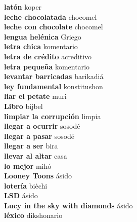 \textbf{ latón  } koper \\
\textbf{ leche chocolatada  } chocomel \\
\textbf{ leche con chocolate  } chocomel \\
\textbf{ lengua helénica  } Griego \\
\textbf{ letra chica  } komentario \\
\textbf{ letra de crédito  } acreditivo \\
\textbf{ letra pequeña  } komentario \\
\textbf{ levantar barricadas  } barikadiá \\
\textbf{ ley fundamental  } konstitushon \\
\textbf{ liar el petate  } muri \\
\textbf{ Libro  } bijbel \\
\textbf{ limpiar la corrupción  } limpia \\
\textbf{ llegar a ocurrir  } sosodé \\
\textbf{ llegar a pasar  } sosodé \\
\textbf{ llegar a ser  } bira \\
\textbf{ llevar al altar  } casa \\
\textbf{ lo mejor  } mihó \\
\textbf{ Looney Toons  } ásido \\
\textbf{ lotería  } bièchi \\
\textbf{ LSD  } ásido \\
\textbf{ Lucy in the sky with diamonds  } ásido \\
\textbf{ léxico  } dikshonario \\
